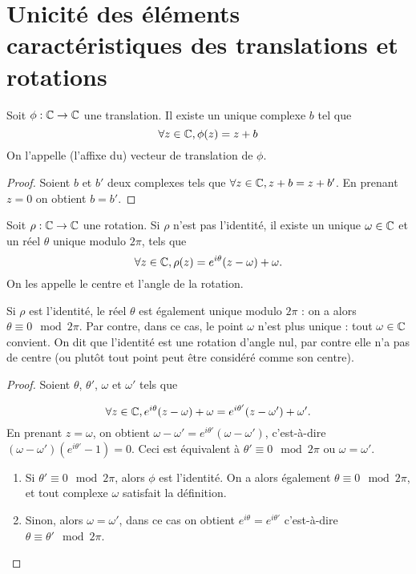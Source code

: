 
\section{Unicité des éléments caractéristiques des translations et rotations}

\begin{proposition}
Soit $\phi : \mathbb{C}\to \mathbb{C}$ une translation. Il existe un unique complexe $b$ tel que 
\[ \forall z\in \mathbb{C}, \phi(z)=z+b\]
On l'appelle (l'affixe du) vecteur de translation de $\phi$.
\end{proposition}
\begin{proof}
Soient $b$ et $b'$ deux complexes tels que $\forall z\in\mathbb{C}, z+b=z+b'$. En prenant $z=0$ on obtient $b=b'$.
\end{proof}

\begin{proposition}
Soit $\rho : \mathbb{C}\to\mathbb{C}$ une rotation. Si $\rho$ n'est pas l'identité, il existe  un unique $\omega\in\mathbb{C}$ et un réel $\theta$ unique modulo $2\pi$, tels que 
\[ \forall z\in\mathbb{C}, \rho(z)=e^{i\theta}(z-\omega)+\omega.\]
On les appelle le centre et l'angle de la rotation.

Si $\rho$ est l'identité, le réel $\theta$ est également unique modulo $2\pi$ : on a alors $\theta\equiv 0 \mod 2\pi$. Par contre, dans ce cas, le point $\omega$ n'est plus unique : tout $\omega\in\mathbb{C}$ convient. On dit que l'identité est une rotation d'angle nul, par contre elle n'a pas de centre (ou plutôt tout point peut être considéré comme son centre).
\end{proposition}
\begin{proof}
Soient $\theta$, $\theta'$, $\omega$ et $\omega'$ tels que 

\[ \forall z\in\mathbb{C}, e^{i\theta}(z-\omega)+\omega = e^{i\theta'}(z-\omega')+\omega'.\]
En prenant $z=\omega$, on obtient $\omega-\omega'=e^{i\theta'}(\omega-\omega')$, c'est-à-dire $(\omega-\omega')(e^{i\theta'}-1)=0$. Ceci est équivalent à $\theta'\equiv 0\mod 2\pi$ ou $\omega=\omega'$.
\begin{enumerate}
\item Si $\theta'\equiv 0\mod 2\pi$, alors $\phi$ est l'identité. On a alors également $\theta\equiv 0 \mod 2\pi$, et tout complexe $\omega$ satisfait la définition.
\item Sinon, alors $\omega=\omega'$, dans ce cas on obtient $e^{i\theta}=e^{i\theta'}$ c'est-à-dire $\theta\equiv \theta'\mod 2\pi$.
\end{enumerate}
\end{proof}

